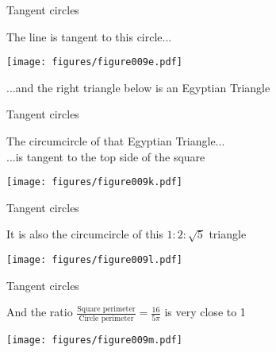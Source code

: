 \documentclass[14pt]{beamer}
\begin{document}
    \begin{frame}{Tangent circles}
        \begin{center}
            The line is tangent to this circle...
        \end{center}
        \hspace{6.18em} \texttt{[image: figures/figure009e.pdf]} \\
        \begin{center}
             ...and the right triangle below is an Egyptian Triangle
        \end{center}
    \end{frame}


    \begin{frame}{Tangent circles}
        \begin{center}
            The circumcircle of that Egyptian Triangle...\\[0.5ex]...is tangent to the top side of the square
        \end{center}
        \hspace{5.05em} \texttt{[image: figures/figure009k.pdf]} \\
        \vspace{1.75em}
    \end{frame}


    \begin{frame}{Tangent circles}
        \begin{center}
            It is also the circumcircle of this $1\!\!:\!\!2\!\!:\!\!\sqrt{5}$ triangle
        \end{center}
        \vspace{1.5em}
        \hspace{5.05em} \texttt{[image: figures/figure009l.pdf]} \\
        \vspace{1.75em}
    \end{frame}


    \begin{frame}{Tangent circles}
        \begin{center}
            And the ratio $\frac{\text{Square perimeter}}{\text{Circle perimeter}} = \frac{16}{5\pi}$ is very close to 1
        \end{center}
        \vspace{1.2em}
        \hspace{5.05em} \texttt{[image: figures/figure009m.pdf]} \\
        \vspace{1.75em}
    \end{frame}
\end{document}
